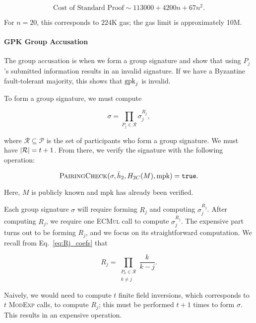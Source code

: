 \begin{equation}
    \text{Cost of Standard Proof} \sim 113000 + 4200n + 67n^{2}.
\end{equation}

\noindent
For $n=20$, this corresponds to $224$K gas;
the gas limit is approximately 10M.



\paragraph{GPK Group Accusation}
The group accusation is when we form a group signature and
show that using $P_{j}$'s submitted information results
in an invalid signature.
If we have a Byzantine fault-tolerant majority,
this shows that $\textrm{gpk}_{j}$ is invalid.

To form a group signature, we must compute

\begin{equation}
    \sigma = \prod_{P_{j}\in\mathcal{R}} \sigma_{j}^{R_{j}},
\end{equation}

\noindent
where $\mathcal{R}\subseteq\mathcal{P}$ is the set of participants
who form a group signature.
We must have $\left| \mathcal{R} \right| = t+1$.
From there, we verify the signature with the following operation:

\begin{equation}
    \textsc{PairingCheck}(\sigma, \bar{h}_{2}, H_{2C}(M), \text{mpk})
        = \texttt{true}.
\end{equation}

\noindent
Here, $M$ is publicly known and $\text{mpk}$ has already
been verified.

Each group signature $\sigma$ will require forming $R_{j}$
and computing $\sigma_{j}^{R_{j}}$.
After computing $R_{j}$, we require one \textsc{ECMul} call
to compute $\sigma_{j}^{R_{j}}$.
The expensive part turns out to be forming $R_{j}$,
and we focus on its straightforward computation.
We recall from Eq.~\eqref{eq:Rj_coefs} that

\begin{equation}
    R_{j} = \prod_{\substack{P_{k}\in\mathcal{R} \\ k\ne j}} \frac{k}{k-j}.
\end{equation}

\noindent
Naively, we would need to compute $t$ finite field inversions,
which corresponds to $t$ \textsc{ModExp} calls, to compute $R_{j}$;
this must be performed $t+1$ times to form $\sigma$.
This results in an expensive operation.

